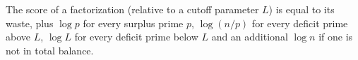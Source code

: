 \begin{definition}
\label{score-def}
\leanok
The score of a factorization (relative to a cutoff parameter $L$) is equal to its waste,
  plus $\log p$ for every surplus prime $p$, $\log (n/p)$ for every deficit prime above $L$,
  $\log L$ for every deficit prime below $L$ and an additional $\log n$ if one is not in
  total balance.
\end{definition}
